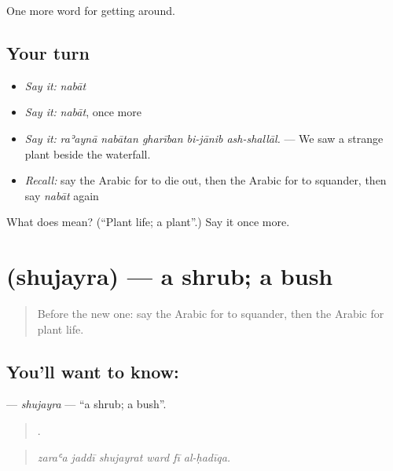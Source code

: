 \begin{grammarlens}[title={What you've built}]
One more word for getting around.
\end{grammarlens}

\subsection*{Your turn}
\begin{itemize}
\raggedright
  \item \emph{Say it:} \emph{nabāt}
  \item \emph{Say it:} \emph{nabāt}, once more
  \item \emph{Say it:} \emph{raʾaynā nabātan gharīban bi-jānib ash-shallāl.} — We saw a strange plant beside the waterfall.
  \item \emph{Recall:} say the Arabic for to die out, then the Arabic for to squander, then say \emph{nabāt} again
\end{itemize}

\begin{tcolorbox}[breakable,colback=teal!4,colframe=teal!35!black,title={Before you move on}]
What does  mean? (\textquotedblleft{}Plant life; a plant\textquotedblright{}.) Say it once more.
\end{tcolorbox}
\section[\texorpdfstring{\ar{شجيرة} (shujayra)}{شجيرة (shujayra)}]{ (shujayra) — a shrub; a bush}

\label{lesson:AR-C468-shujayra}



\begin{quote}
Before the new one: say the Arabic for to squander, then the Arabic for plant life.
\end{quote}

\subsection*{You'll want to know: }
\textbf{} — \emph{shujayra} — \textquotedblleft{}a shrub; a bush\textquotedblright{}.

\begin{quote}
     .
\end{quote}

\begin{quote}
\emph{zaraʿa jaddī shujayrat ward fī al-ḥadīqa.}
\end{quote}

